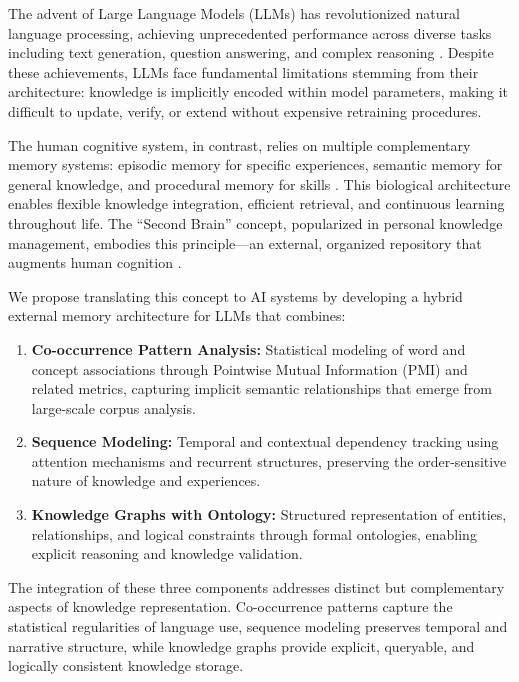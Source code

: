 \documentclass[conference]{IEEEtran}
\begin{document}
The advent of Large Language Models (LLMs) has revolutionized natural language processing, achieving unprecedented performance across diverse tasks including text generation, question answering, and complex reasoning \cite{brown2020language, chowdhery2022palm}. Despite these achievements, LLMs face fundamental limitations stemming from their architecture: knowledge is implicitly encoded within model parameters, making it difficult to update, verify, or extend without expensive retraining procedures.

The human cognitive system, in contrast, relies on multiple complementary memory systems: episodic memory for specific experiences, semantic memory for general knowledge, and procedural memory for skills \cite{tulving1972episodic}. This biological architecture enables flexible knowledge integration, efficient retrieval, and continuous learning throughout life. The ``Second Brain'' concept, popularized in personal knowledge management, embodies this principle—an external, organized repository that augments human cognition \cite{forte2022building}.

We propose translating this concept to AI systems by developing a hybrid external memory architecture for LLMs that combines:

\begin{enumerate}
    \item \textbf{Co-occurrence Pattern Analysis:} Statistical modeling of word and concept associations through Pointwise Mutual Information (PMI) and related metrics, capturing implicit semantic relationships that emerge from large-scale corpus analysis.
    
    \item \textbf{Sequence Modeling:} Temporal and contextual dependency tracking using attention mechanisms and recurrent structures, preserving the order-sensitive nature of knowledge and experiences.
    
    \item \textbf{Knowledge Graphs with Ontology:} Structured representation of entities, relationships, and logical constraints through formal ontologies, enabling explicit reasoning and knowledge validation.
\end{enumerate}

The integration of these three components addresses distinct but complementary aspects of knowledge representation. Co-occurrence patterns capture the statistical regularities of language use, sequence modeling preserves temporal and narrative structure, while knowledge graphs provide explicit, queryable, and logically consistent knowledge storage.
\end{document}
